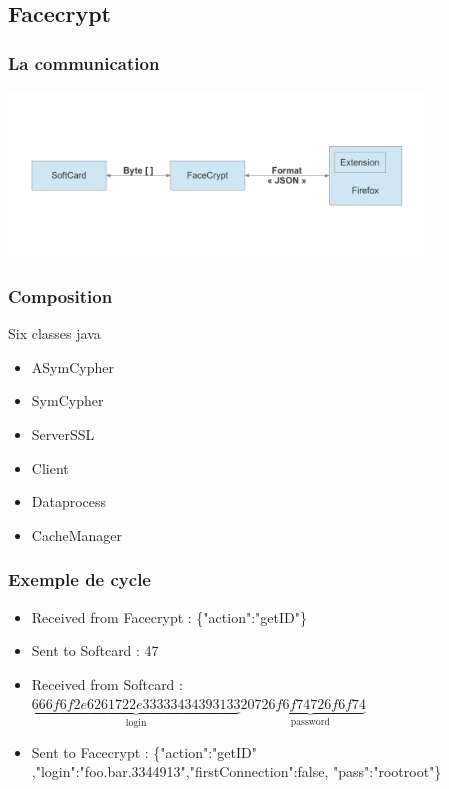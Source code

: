 \documentclass{beamer}
\begin{document}
\subsection{Facecrypt}
\begin{frame}
    \frametitle{La communication}
    \includegraphics[width=11cm]{schema_dolby}
\end{frame}

\begin{frame}
    \frametitle{Composition}
	\begin{block}{Six classes java}
	\begin{itemize}
	\item ASymCypher
	\item SymCypher
	\item ServerSSL
	\item Client
	\item Dataprocess
	\item CacheManager
	\end{itemize}
	\end{block}
\end{frame}

\begin{frame}
    \frametitle{Exemple de cycle}

	\begin{itemize}
	\item Received from Facecrypt : \{"action":"getID"\}
	\item Sent to Softcard : 47
	\item Received from Softcard : $\underbrace{666f6f2e6261722e33333434393133}_{\textrm{login}} 20 \underbrace{726f6f74726f6f74}_{\textrm{password}}$
	\item Sent to Facecrypt : \{"action":"getID" ,"login":"foo.bar.3344913","firstConnection":false, "pass":"rootroot"\}
\end{itemize}
\end{frame}
\end{document}
